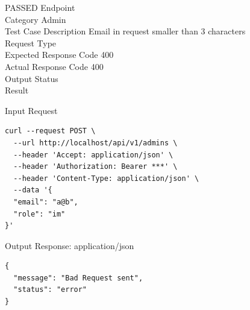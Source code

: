 \begin{testcase}{30}{PASSED}
Endpoint \hfill {}\\
Category \hfill Admin\\
Test Case Description \hfill Email in request smaller than 3 characters\\

Request Type    \hfill {}\\
Expected Response Code    \hfill 400\\
Actual Response Code    \hfill 400\\

Output Status \hfill {}\\
Result \hfill {}

\begin{ipblock}{Input Request}
\begin{verbatim}
curl --request POST \
  --url http://localhost/api/v1/admins \
  --header 'Accept: application/json' \
  --header 'Authorization: Bearer ***' \
  --header 'Content-Type: application/json' \
  --data '{
  "email": "a@b",
  "role": "im"
}'
\end{verbatim}
\end{ipblock}

\begin{opblock}{Output Response: application/json}
\begin{verbatim}
{
  "message": "Bad Request sent",
  "status": "error"
}
\end{verbatim}
\end{opblock}
\end{testcase}

